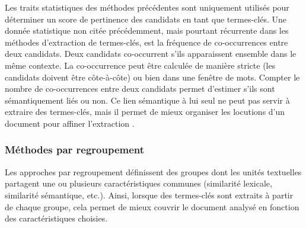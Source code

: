         Les traits statistiques des méthodes précédentes sont uniquement
        utilisés pour déterminer un score de pertinence des candidats en tant
        que termes-clés. Une donnée statistique non citée précédemment, mais
        pourtant récurrente dans les méthodes d'extraction de termes-clés, est
        la fréquence de co-occurrences entre deux candidats. Deux candidats
        co-occurrent s'ils apparaissent ensemble dans le même contexte. La
        co-occurrence peut être calculée de manière stricte (les candidats
        doivent être côte-à-côte) ou bien dans une fenêtre de mots. Compter le
        nombre de co-occurrences entre deux candidats permet d'estimer s'ils
        sont sémantiquement liés ou non. Ce lien sémantique à lui seul ne peut
        pas servir à extraire des termes-clés, mais il permet de mieux
        organiser les locutions d'un document pour affiner l'extraction
        \cite{matsuo2004wordcooccurrence, liu2009keycluster,
        mihalcea2004textrank}.

      \subsubsection{Méthodes par regroupement}
      \label{subsubsec:main-state_of_the_art-automatic_keyphrase_extraction-unsupervised_keyphrase_extraction-clustering_approaches}
        Les approches par regroupement définissent des groupes dont les unités textuelles partagent une ou
        plusieurs caractéristiques communes (similarité lexicale, similarité
        sémantique, etc.). Ainsi, lorsque des termes-clés sont extraits à
        partir de chaque groupe, cela permet de mieux couvrir le document
        analysé en fonction des caractéristiques choisies.


